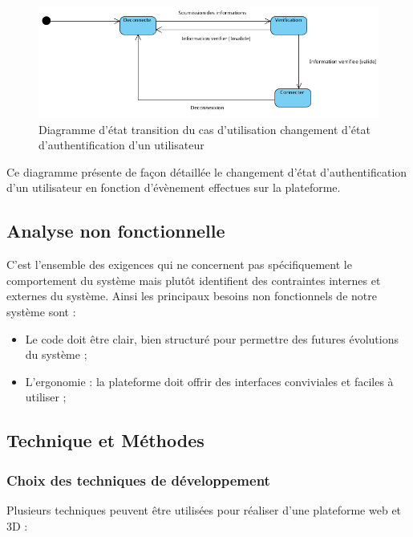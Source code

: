 \begin{itemize}
	      \begin{figure}[H]
		      \centering
		      \includegraphics[width=1\textwidth]{img/etu}
		      \caption{Diagramme d’état transition du cas d'utilisation changement d’état d'authentification d’un utilisateur}
		      \label{fig:mesh1}
	      \end{figure}

	      Ce diagramme présente de façon détaillée le changement d’état d’authentification d’un utilisateur en fonction d’évènement effectues sur la plateforme.
\end{itemize}

\subsection{Analyse non fonctionnelle} %

C’est l’ensemble des exigences qui ne concernent pas spécifiquement le comportement du système mais plutôt identifient des contraintes internes et externes du système. Ainsi les principaux besoins non fonctionnels de notre système sont :

\begin{itemize}
	\item Le code doit être clair, bien structuré pour permettre des futures évolutions du système ;
	\item L’ergonomie : la plateforme doit offrir des interfaces conviviales et faciles à utiliser ;
\end{itemize}

\subsection{Technique et Méthodes} %

\subsubsection{Choix des techniques de développement}

Plusieurs techniques peuvent être utilisées pour réaliser d’une plateforme web et 3D :

